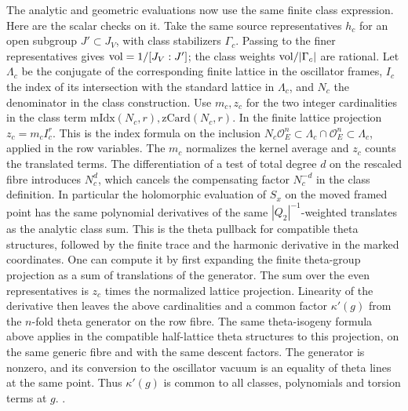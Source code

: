 The analytic and geometric evaluations now use the same
finite class expression. Here are the scalar checks on
it. Take the same source representatives \(h_c\) for an
open subgroup \(J'\subset J_V\), with class stabilizers
\(\Gamma_c\). Passing to the finer representatives gives
\({\rm vol}=1/[J_V:J']\); the class weights
\({\rm vol}/|\Gamma_c|\) are rational. Let \(\Lambda_c\)
be the conjugate of the corresponding finite lattice
in the oscillator frames, \(I_c\) the index of its
intersection with the standard lattice in \(\Lambda_c\),
and \(N_c\) the denominator in the class construction.
Use \(m_c,z_c\) for the two integer cardinalities in the
class term \(\mathrm{mIdx}(N_c,r),\mathrm{zCard}(N_c,r)\).
In the finite lattice projection \(z_c=m_c I_c^r\).
This is the index formula on the inclusion
\(N_c\mathcal O_E^n\subset\Lambda_c\cap\mathcal O_E^n
 \subset\Lambda_c\), applied in the row variables.
The \(m_c\) normalizes the kernel average and \(z_c\)
counts the translated terms. The differentiation of a
test of total degree \(d\) on the rescaled fibre
introduces \(N_c^d\), which cancels the compensating
factor \(N_c^{-d}\) in the class definition. In particular
the holomorphic evaluation of \(S_x\) on the moved
framed point has the same polynomial derivatives of
the same \(|Q_2|^{-1}\)-weighted translates as the
analytic class sum. This is the theta pullback for
compatible theta structures, followed by the finite
trace and the harmonic derivative in the marked
coordinates. One can compute it by first expanding the
finite theta-group projection as a sum of translations
of the generator. The sum over the even representatives
is \(z_c\) times the normalized lattice projection.
Linearity of the derivative then leaves the above
cardinalities and a common factor \(\kappa'(g)\)
from the \(n\)-fold theta generator on the row fibre.
The same theta-isogeny formula above applies in the compatible
half-lattice theta structures to this projection, on the same
generic fibre and with the same descent factors.
The generator is nonzero, and its conversion to the
oscillator vacuum is an equality of theta lines at the
same point. Thus \(\kappa'(g)\) is common to all classes,
polynomials and torsion terms at \(g\).
\cite[\S1, Theorem~4]{mumford-theta-isogeny}
.

